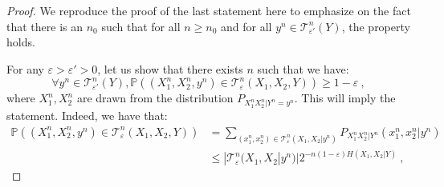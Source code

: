       \begin{proof}
        We reproduce the proof of the last statement here to emphasize on the fact that there is an $n_0$ such that for all $n \geq n_0$ and for all $y^n \in \mathcal{T}^n_{\varepsilon'}(Y)$, the property holds.

        For any $\varepsilon > \varepsilon' > 0$, let us show that there exists $n$ such that we have:
        \[ \forall y^n \in \mathcal{T}^n_{\varepsilon'}(Y), \mathbb{P}\left((X_1^n,X_2^n,y^n) \in \mathcal{T}^n_{\varepsilon}(X_1,X_2,Y) \right) \geq 1-\varepsilon \ , \]        
        where $X_1^n, X_2^n$ are drawn from the distribution $P_{X_1^nX_2^n|Y^n=y^n}$. This will imply the statement. Indeed, we have that:
        \begin{equation}
          \begin{aligned}
            \mathbb{P}\left((X_1^n,X_2^n,y^n) \in \mathcal{T}^n_{\varepsilon}(X_1,X_2,Y) \right) &= \sum_{(x_1^n,x_2^n) \in \mathcal{T}^n_{\varepsilon}(X_1,X_2|y^n)} P_{X_1^nX_2^n|Y^n}(x_1^n,x_2^n|y^n) \\
            &\leq |\mathcal{T}^n_{\varepsilon}(X_1,X_2|y^n)|2^{-n(1-\varepsilon)H(X_1,X_2|Y)} \ ,
          \end{aligned}
        \end{equation}
      

\end{proof}
